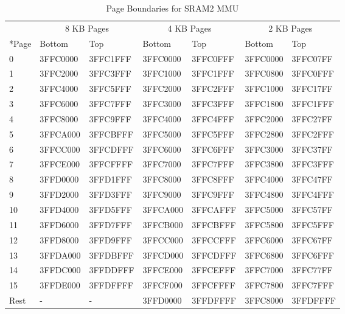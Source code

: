 \begin{table}[H]
    \centering
    \caption{Page Boundaries for SRAM2 MMU}
    \label{table:Page_Boundaries_SRAM2_MMU}
     \begin{tabular}[h]{ |p{1.5cm}|p{2cm}|p{2cm}|p{2cm}|p{2cm}|p{2cm}|p{2cm}|}
        \hline
        \rowcolor{lightgray}
        & \multicolumn{2}{c|}{8 KB Pages} & \multicolumn{2}{c|}{4 KB Pages} & \multicolumn{2}{c|}{2 KB Pages} \\
        \cline{2-6}
        \rowcolor{lightgray}
        \multirow{-2}*{Page} & Bottom & Top & Bottom & Top & Bottom & Top \\
        \hline
   	0 & 3FFC0000 & 3FFC1FFF & 3FFC0000 & 3FFC0FFF & 3FFC0000 & 3FFC07FF \\ \hline
	1 & 3FFC2000 & 3FFC3FFF & 3FFC1000 & 3FFC1FFF & 3FFC0800 & 3FFC0FFF \\ \hline
	2 & 3FFC4000 & 3FFC5FFF & 3FFC2000 & 3FFC2FFF & 3FFC1000 & 3FFC17FF \\ \hline
	3 & 3FFC6000 & 3FFC7FFF & 3FFC3000 & 3FFC3FFF & 3FFC1800 & 3FFC1FFF \\ \hline
	4 & 3FFC8000 & 3FFC9FFF & 3FFC4000 & 3FFC4FFF & 3FFC2000 & 3FFC27FF \\ \hline
	5 & 3FFCA000 & 3FFCBFFF & 3FFC5000 & 3FFC5FFF & 3FFC2800 & 3FFC2FFF \\ \hline
	6 & 3FFCC000 & 3FFCDFFF & 3FFC6000 & 3FFC6FFF & 3FFC3000 & 3FFC37FF \\ \hline
	7 & 3FFCE000 & 3FFCFFFF & 3FFC7000 & 3FFC7FFF & 3FFC3800 & 3FFC3FFF \\ \hline
	8 & 3FFD0000 & 3FFD1FFF & 3FFC8000 & 3FFC8FFF & 3FFC4000 & 3FFC47FF \\ \hline
	9 & 3FFD2000 & 3FFD3FFF & 3FFC9000 & 3FFC9FFF & 3FFC4800 & 3FFC4FFF \\ \hline
	10 & 3FFD4000 & 3FFD5FFF & 3FFCA000 & 3FFCAFFF & 3FFC5000 & 3FFC57FF \\ \hline
	11 & 3FFD6000 & 3FFD7FFF & 3FFCB000 & 3FFCBFFF & 3FFC5800 & 3FFC5FFF \\ \hline
	12 & 3FFD8000 & 3FFD9FFF & 3FFCC000 & 3FFCCFFF & 3FFC6000 & 3FFC67FF \\ \hline
	13 & 3FFDA000 & 3FFDBFFF & 3FFCD000 & 3FFCDFFF & 3FFC6800 & 3FFC6FFF \\ \hline
	14 & 3FFDC000 & 3FFDDFFF & 3FFCE000 & 3FFCEFFF & 3FFC7000 & 3FFC77FF \\ \hline
	15 & 3FFDE000 & 3FFDFFFF & 3FFCF000 & 3FFCFFFF & 3FFC7800 & 3FFC7FFF \\ \hline
	Rest & - & - & 3FFD0000 & 3FFDFFFF & 3FFC8000 & 3FFDFFFF \\ \hline
    \end{tabular}
\end{table}
